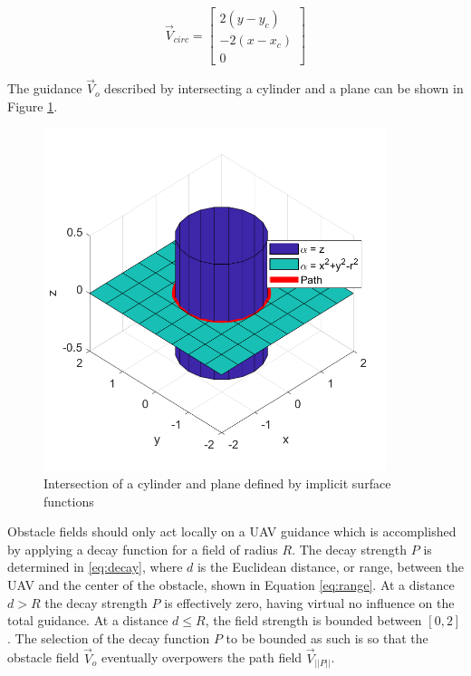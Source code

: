 \documentclass[numbered,pdftex]{ohio-etd}
\begin{document}
\begin{equation}
\label{eq:vcirc_circle}
\overrightarrow{V}_{circ} =  \begin{bmatrix}  2(y-y_c) \\[6pt] -2(x-x_c) \\[6pt] 0\end{bmatrix}
\end{equation}

The guidance $\overrightarrow{V}_o$ described by intersecting a cylinder and a plane can be shown in Figure \ref{fig:cylinderIntersection}. 

\begin{figure}[H]
	\centering
	\includegraphics[width=10cm]{Figures/cylinderIntersection}
	\caption{Intersection of a cylinder and plane defined by implicit surface functions}
	\label{fig:cylinderIntersection}
\end{figure}

Obstacle fields should only act locally on a UAV guidance which is accomplished by applying a decay function for a field of radius $R$. The decay strength $P$ is determined in \ref{eq:decay}, where $d$ is the Euclidean distance, or range, between the UAV and the center of the obstacle, shown in Equation \ref{eq:range}. At a distance $d>R$ the decay strength $P$ is effectively zero, having virtual no influence on the total guidance. At a distance $d\leq R$, the field strength is bounded between $[0,2]$. The selection of the decay function $P$ to be bounded as such is so that the obstacle field $\overrightarrow{V}_o$ eventually overpowers the path field $\overrightarrow{V}_{||P||}$. 
\end{document}
